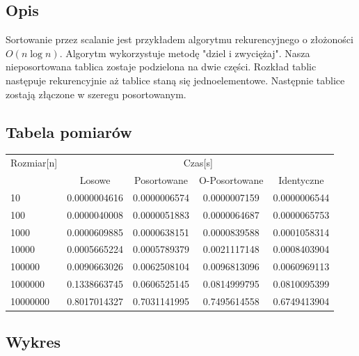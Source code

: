 \documentclass[13pt]{article}
\begin{document}
\subsection{Opis}
Sortowanie przez scalanie jest przykładem algorytmu rekurencyjnego o złożoności $O(n\log{}n)$. Algorytm wykorzystuje metodę "dziel i zwyciężaj". Nasza nieposortowana tablica zostaje podzielona na dwie części. Rozkład tablic następuje rekurencyjnie aż tablice staną się jednoelementowe. Następnie tablice zostają złączone w szeregu posortowanym.
\subsection{Tabela pomiarów}

\begin{center}
\begin{tabular}{lcccc}  
\\
\toprule
Rozmiar[n] & \multicolumn{4}{c}{Czas[s]} \\
\cmidrule(r){2-5}
 & Losowe & Posortowane & O-Posortowane & Identyczne \\
\midrule
10       & 0.0000004616   & 0.0000006574 & 0.0000007159  & 0.0000006544 \\
100      & 0.0000040008   & 0.0000051883 & 0.0000064687  & 0.0000065753 \\
1000     & 0.0000609885   & 0.0000638151 & 0.0000839588  & 0.0001058314 \\
10000    & 0.0005665224   & 0.0005789379 & 0.0021117148  & 0.0008403904 \\
100000   & 0.0090663026   & 0.0062508104 & 0.0096813096  & 0.0060969113 \\
1000000  & 0.1338663745   & 0.0606525145 & 0.0814999795  & 0.0810095399 \\
10000000 & 0.8017014327   & 0.7031141995 & 0.7495614558  & 0.6749413904 \\
\bottomrule
\end{tabular}
\end{center}

\subsection{Wykres}
\end{document}
